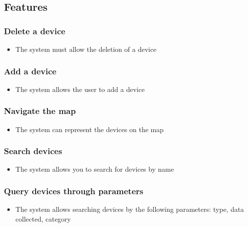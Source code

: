 \documentclass{scrreprt}
\begin{document}
\subsection{Features}

\subsubsection{Delete a device}

\begin{itemize}
    \item The system must allow the deletion of a device
\end{itemize}

\subsubsection{Add a device}

\begin{itemize}
    \item The system allows the user to add a device
\end{itemize}

\subsubsection{Navigate the map}

\begin{itemize}
    \item The system can represent the devices on the map
\end{itemize}

\subsubsection{Search devices}

\begin{itemize}
    \item The system allows you to search for devices by name
\end{itemize}

\subsubsection{Query devices through parameters}

\begin{itemize}
    \item The system allows searching devices by the following parameters: type, data collected, category
\end{itemize}
\end{document}
